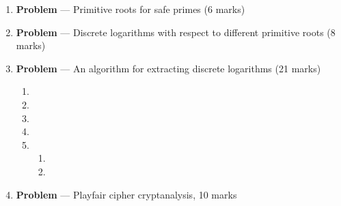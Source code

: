 \documentclass[11pt]{article}
\theoremstyle{definition}
\newcounter{problem}
\begin{document}
\begin{enumerate}
\begin{enumerate}
\item

\item

\item
\end{enumerate}


\newpage

\item[] \textbf{Problem \theproblem} --- Primitive roots for safe primes (6 marks)

\newpage

\item[] \textbf{Problem \theproblem} --- Discrete logarithms with respect to different primitive
    roots (8 marks)

\newpage

\item[] \textbf{Problem \theproblem} --- An algorithm for extracting discrete logarithms (21
    marks)

\begin{enumerate}
\item

\item

\item

\item

\item
    \begin{enumerate}
    \item

    \item
\end{enumerate}
\end{enumerate}

\newpage

 

\item[] \textbf{Problem \theproblem} --- Playfair cipher cryptanalysis, 10 marks

\end{enumerate}
\end{document}
